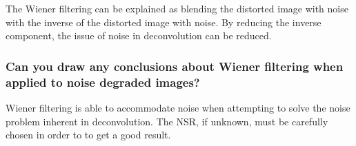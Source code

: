 \documentclass[article, 1.5space, letterpaper, 12pt, oneside, header, footer]{SydeClass}
\begin{document}
The Wiener filtering can be explained as blending the distorted image with noise with the inverse of the distorted image with noise. By reducing the inverse component, the issue of noise in deconvolution can be reduced.

\subsubsection{Can you draw any conclusions about Wiener filtering when applied to noise degraded images?}

Wiener filtering is able to accommodate noise when attempting to solve the noise problem inherent in deconvolution. The NSR, if unknown, must be carefully chosen in order to to get a good result.

\appendix
\newpage


\end{document}
